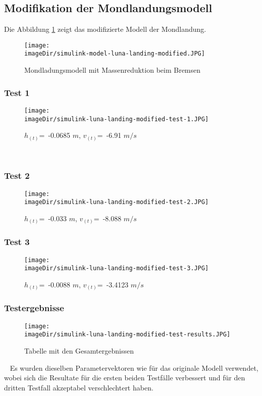 \newpage

\subsection{Modifikation der Mondlandungsmodell}
\label{sec:sub-simulink-modified-model-luna-landing}
Die Abbildung \ref{fig:simulink-luna-landing-modified} zeigt das modifizierte Modell der Mondlandung.
\begin{figure}[h]
	\centering
	\texttt{[image: \\imageDir/simulink-model-luna-landing-modified.JPG]}
	\caption{Mondladungsmodell mit Massenreduktion beim Bremsen}
	\label{fig:simulink-luna-landing-modified}
\end{figure}

\subsubsection{Test 1}
\begin{figure}[h]
	\centering
	\texttt{[image: \\imageDir/simulink-luna-landing-modified-test-1.JPG]}
	\caption{$h_{(t)}$=~-0.0685 $m$, $v_{(t)}$=~-6.91 $m/s$}
	\label{fig:simulink-luna-landing-modified-test-1}
\end{figure}
\ \newpage

\subsubsection{Test 2}
\begin{figure}[h]
	\centering
	\texttt{[image: \\imageDir/simulink-luna-landing-modified-test-2.JPG]}
	\caption{$h_{(t)}$=~-0.033 $m$, $v_{(t)}$=~-8.088 $m/s$}
	\label{fig:simulink-luna-landing-modified-test-2}
\end{figure}

\subsubsection{Test 3}
\begin{figure}[h]
	\centering
	\texttt{[image: \\imageDir/simulink-luna-landing-modified-test-3.JPG]}
	\caption{$h_{(t)}$=~-0.0088 $m$, $v_{(t)}$=~-3.4123 $m/s$}
	\label{fig:simulink-luna-landing-modified-test-3}
\end{figure}
\newpage

\subsubsection{Testergebnisse}
\label{sec:simulink-luna-landing-modified-test-results}
\begin{figure}[h]
	\centering
	\texttt{[image: \\imageDir/simulink-luna-landing-modified-test-results.JPG]}
	\caption{Tabelle mit den Gesamtergebnissen}
	\label{fig:simulink-luna-landing-modified-test-result}
\end{figure}
\ \newline
Es wurden dieselben Parametervektoren wie für das originale Modell verwendet, wobei sich die Resultate für die ersten beiden Testfälle verbessert und für den dritten Testfall akzeptabel verschlechtert haben.